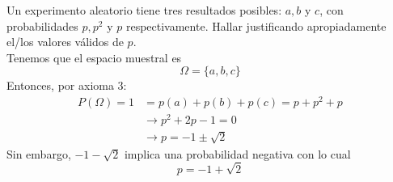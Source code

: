 \item Un experimento aleatorio tiene tres resultados posibles: $a,b$ y $c$, con probabilidades $p,p^2$ y $p$ respectivamente. Hallar justificando apropiadamente el/los valores válidos de $p$.\e\\
    Tenemos que el espacio muestral es\[\Omega=\{a,b,c\}\]
    Entonces, por axioma 3:\begin{align*}
        P(\Omega)=1&=p(a)+p(b)+p(c)=p+p^2+p\\
        &\to p^2+2p-1=0\\
        &\to p=-1\pm\sqrt{2} 
    \end{align*}
    Sin embargo, $-1-\sqrt{2}$ implica una probabilidad negativa con lo cual\[p=-1+\sqrt{2}\]